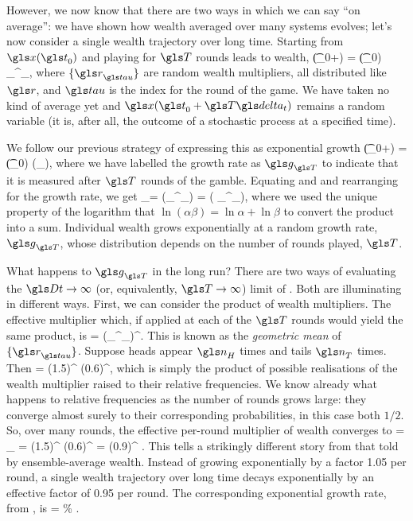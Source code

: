 However, we now know that there are two ways in which we can say ``on average'': we have shown how wealth averaged over many systems evolves; let's now consider a single wealth trajectory over long time. Starting from $\x(\t_0)$ and playing for $\T$ rounds leads to wealth,
\be
\x(\t_0+\T\dt) = \x(\t_0) \prod_{}^\T \gr_\gtau,
\ee
where $\{\gr_\gtau\}$ are random wealth multipliers, all distributed like $\gr$, and $\gtau$ is the index for the round of the game. We have taken no kind of average yet and $\x(\t_0+\T\dt)$ remains a random variable (it is, after all, the outcome of a stochastic process at a specified time).

We follow our previous strategy of expressing this as exponential growth
\be
\x(\t_0+\Dt) = \x(\t_0) \exp(\g_\T\Dt),
\ee
where we have labelled the growth rate as $\g_\T$ to indicate that it is measured after $\T$ rounds of the gamble. Equating  and  and rearranging for the growth rate, we get
\be
\g_\T =  \ln\left(\prod_{}^\T \gr_\gtau\right) =  \left( \sum_{}^\T \ln\gr_\gtau\right),
\ee
where we used the unique property of the logarithm that $\ln(\alpha\beta) = \ln\alpha + \ln\beta$ to convert the product into a sum. Individual wealth grows exponentially at a random growth rate, $\g_\T$, whose distribution depends on the number of rounds played, $\T$.

What happens to $\g_\T$ in the long run? There are two ways of evaluating the $\Dt\to\infty$ (or, equivalently, $\T\to\infty$) limit of . Both are illuminating in different ways. First, we can consider the product of wealth multipliers. The effective multiplier which, if applied at each of the $\T$ rounds would yield the same product, is
\be
\greff = \left(\prod_{}^\T \gr_\gtau\right)^.
\ee
This is known as the \textit{geometric mean} of $\{\gr_\gtau\}$. Suppose heads appear $\gn_H$ times and tails $\gn_T$ times. Then
\be
\greff = (1.5)^ (0.6)^,
\ee
which is simply the product of possible realisations of the wealth multiplier raised to their relative frequencies. We know already what happens to relative frequencies as the number of rounds grows large: they converge almost surely to their corresponding probabilities, in this case both $1/2$. So, over many rounds, the effective per-round multiplier of wealth converges to
\be
\grtime = \lim_{\T\to\infty} \greff = (1.5)^ (0.6)^ = (0.9)^  .
\ee
This tells a strikingly different story from that told by ensemble-average wealth. Instead of growing exponentially by a factor 1.05 per round, a single wealth trajectory over long time decays exponentially by an effective factor of 0.95 per round. The corresponding exponential growth rate, from , is
\be
\ggtime = \frac{\ln\grtime}{\dt} \% .
\ee

